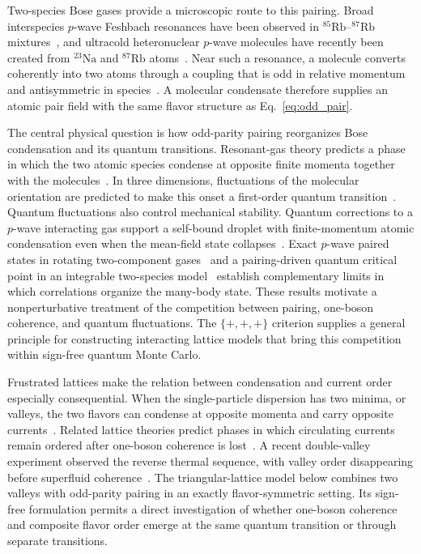 \documentclass[onecolumn,aps,prb,amsmath,amssymb,superscriptaddress,longbibliography]{revtex4-2}
\begin{document}
Two-species Bose gases provide a microscopic route to this pairing.  Broad interspecies \(p\)-wave Feshbach resonances have been observed in \(^{85}\mathrm{Rb}\)--\(^{87}\mathrm{Rb}\) mixtures~\cite{dongCuiShen2016pwave}, and ultracold heteronuclear \(p\)-wave molecules have recently been created from \(^{23}\mathrm{Na}\) and \(^{87}\mathrm{Rb}\) atoms~\cite{jiaGuoHuangWang2026pwave}.  Near such a resonance, a molecule converts coherently into two atoms through a coupling that is odd in relative momentum and antisymmetric in species~\cite{choiRadzihovsky2011finite}.  A molecular condensate therefore supplies an atomic pair field with the same flavor structure as Eq.~\eqref{eq:odd_pair}.

The central physical question is how odd-parity pairing reorganizes Bose condensation and its quantum transitions.  Resonant-gas theory predicts a phase in which the two atomic species condense at opposite finite momenta together with the molecules~\cite{radzihovskyChoi2009pwave,choiRadzihovsky2011finite}.  In three dimensions, fluctuations of the molecular orientation are predicted to make this onset a first-order quantum transition~\cite{choiRadzihovsky2011finite}.  Quantum fluctuations also control mechanical stability.  Quantum corrections to a \(p\)-wave interacting gas support a self-bound droplet with finite-momentum atomic condensation even when the mean-field state collapses~\cite{liPanLiu2019droplets}.  Exact \(p\)-wave paired states in rotating two-component gases~\cite{papenbrockReimannKavoulakis2012pwave} and a pairing-driven quantum critical point in an integrable two-species model~\cite{lermaHernandezDukelsky2019pwave} establish complementary limits in which correlations organize the many-body state.  These results motivate a nonperturbative treatment of the competition between pairing, one-boson coherence, and quantum fluctuations.  The \(\{+,+,+\}\) criterion supplies a general principle for constructing interacting lattice models that bring this competition within sign-free quantum Monte Carlo.

Frustrated lattices make the relation between condensation and current order especially consequential.  When the single-particle dispersion has two minima, or valleys, the two flavors can condense at opposite momenta and carry opposite currents~\cite{liNatuParamekanti2014chiral}.  Related lattice theories predict phases in which circulating currents remain ordered after one-boson coherence is lost~\cite{zaletel2014prb,liParamekantiHemmerich2014chiral}.  A recent double-valley experiment observed the reverse thermal sequence, with valley order disappearing before superfluid coherence~\cite{yuWuZhang2025vestigial}.  The triangular-lattice model below combines two valleys with odd-parity pairing in an exactly flavor-symmetric setting.  Its sign-free formulation permits a direct investigation of whether one-boson coherence and composite flavor order emerge at the same quantum transition or through separate transitions.
\end{document}
